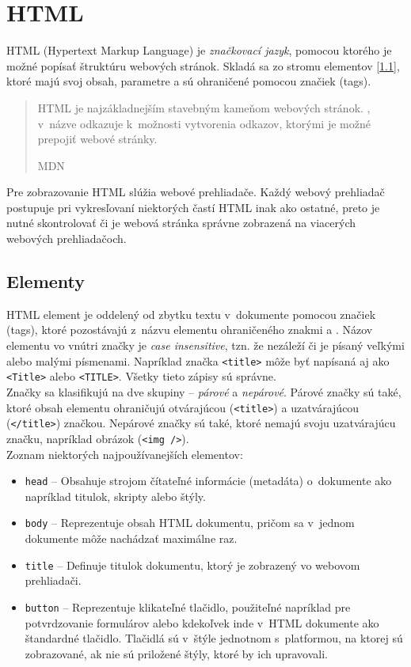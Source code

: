 \section{HTML}
\label{theory:HTML}
HTML (Hypertext Markup Language) je \emph{značkovací jazyk}, pomocou ktorého je možné popísať štruktúru webových stránok. Skladá sa zo stromu elementov [\ref{theory:HTML:elements}], ktoré majú svoj obsah, parametre a sú ohraničené pomocou značiek (tags).

\blockquote[MDN \cite{MDN}]{HTML je najzákladnejším stavebným kameňom webových stránok. , v~názve odkazuje k~možnosti vytvorenia odkazov, ktorými je možné prepojiť webové stránky.}

\noindent Pre zobrazovanie HTML slúžia webové prehliadače. Každý webový prehliadač postupuje pri vykresľovaní niektorých častí HTML inak ako ostatné, preto je nutné skontrolovať či je webová stránka správne zobrazená na viacerých webových prehliadačoch.

\subsection{Elementy}
\label{theory:HTML:elements}
HTML element je oddelený od zbytku textu v~dokumente pomocou značiek (tags), ktoré pozostávajú z~názvu elementu ohraničeného znakmi \uv{\texttt{<}} a \uv{\texttt{>}}. Názov elementu vo vnútri značky je \emph{case insensitive}, tzn. že nezáleží či je písaný veľkými alebo malými písmenami. Napríklad značka \texttt{<title>} môže byť napísaná aj ako \texttt{<Title>} alebo \texttt{<TITLE>}. Všetky tieto zápisy sú správne. \cite{MDN} \\

\noindent Značky sa klasifikujú na dve skupiny -- \emph{párové} a \emph{nepárové}. Párové značky sú také, ktoré obsah elementu ohraničujú otvárajúcou (\texttt{<title>}) a uzatvárajúcou (\texttt{</title>}) značkou. Nepárové značky sú také, ktoré nemajú svoju uzatvárajúcu značku, napríklad obrázok (\texttt{<img />}). \\

\noindent Zoznam niektorých najpoužívanejších elementov:
\begin{itemize}
	\item \texttt{head} -- Obsahuje strojom čítateľné informácie (metadáta) o~dokumente ako napríklad titulok, skripty alebo štýly. \cite{MDN}
	\item \texttt{body} -- Reprezentuje obsah HTML dokumentu, pričom sa v~jednom dokumente môže nachádzať maximálne raz. \cite{MDN}
	\item \texttt{title} -- Definuje titulok dokumentu, ktorý je zobrazený vo webovom prehliadači. \cite{MDN}
	\item \texttt{button} -- Reprezentuje klikateľné tlačidlo, použiteľné napríklad pre potvrdzovanie formulárov alebo kdekoľvek inde v~HTML dokumente ako štandardné tlačidlo. Tlačidlá sú v~štýle jednotnom s~platformou, na ktorej sú zobrazované, ak nie sú priložené štýly, ktoré by ich upravovali. \cite{MDN}
\end{itemize}

